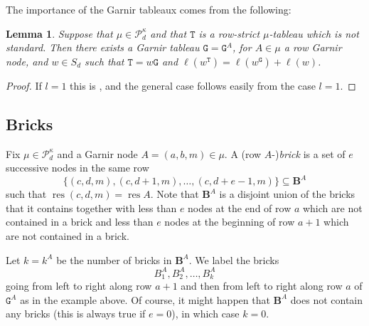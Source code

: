 \documentclass[twoside,11pt,reqno]{amsart}
\numberwithin{equation}{section}
\newtheorem{Lemma}[equation]{Lemma}
\theoremstyle{definition}  %
\newcommand{\res}{\operatorname{res}}
\newcommand{\0}{{\bar 0}}
\newcommand{\1}{{\bar 1}}
\def\Belt{\mathbf{B}}
\newcommand\Par[1][]{{\mathscr P}^{\kappa#1}}
\def\T{{\mathtt T}}
\def\G{{\mathtt G}}
\begin{document}
The importance of the Garnir tableaux comes from the following: 



\begin{Lemma} \label{LAndrew}%
Suppose that $\mu\in\Par_d$ and that $\T$ is a row-strict $\mu$-tableau which is not standard. Then
there exists a Garnir tableau $\G=\G^A$, for $A\in\mu$ a row Garnir node,  and $w\in S_d$ such that 
$\T=w\G$ and $\ell(w^\T)=\ell(w^\G)+\ell(w)$. 
\end{Lemma}
\begin{proof}
If $l=1$ this is \cite[Lemma 3.14]{MathasB}, and the general case follows  easily from the case $l=1$. 
\end{proof}


\subsection{Bricks}\label{SSBricks}
Fix $\mu\in\Par_d$ and a Garnir node $A=(a,b,m)\in\mu$. %
A (row $A$-){\em brick} is a set of $e$ successive nodes in the same row 
$$\{(c,d,m),(c,d+1,m),\dots,(c,d+e-1,m)\}\subseteq \Belt^A$$ such that
$\res(c,d,m)=\res A$. Note that $\Belt^A$ is a disjoint union of the bricks that it contains together
with less than $e$ nodes at the end of row $a$ which are not contained in a brick and less than $e$ nodes
at the beginning of row $a+1$ which are not contained in a brick. 

Let $k=k^A$ be the number of bricks in $\Belt^A$. We label the bricks 
$$B_1^A,B_2^A,\dots, B_k^A$$  
going from left to right along row $a+1$ and then from left to right along row $a$ of $\G^A$ as in the example above. Of course, it might happen that $\Belt^A$ does not contain any bricks (this is always true
if $e=0$), in which case $k=0$.
\end{document}
